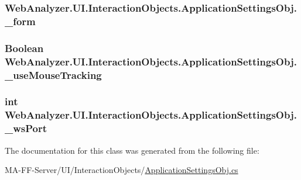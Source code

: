 \subsubsection[{\+\_\+form}]{ Web\+Analyzer.\+U\+I.\+Interaction\+Objects.\+Application\+Settings\+Obj.\+\_\+form\hspace{0.3cm}{\ttfamily [private]}}\label{class_web_analyzer_1_1_u_i_1_1_interaction_objects_1_1_application_settings_obj_a6b08a377c6dc1e9f0e32d0c786012756}
\hypertarget{class_web_analyzer_1_1_u_i_1_1_interaction_objects_1_1_application_settings_obj_a91a38f0e61ad09629d88131e49888523}{}
\subsubsection[{\+\_\+use\+Mouse\+Tracking}]{\setlength{\rightskip}{0pt plus 5cm}Boolean Web\+Analyzer.\+U\+I.\+Interaction\+Objects.\+Application\+Settings\+Obj.\+\_\+use\+Mouse\+Tracking\hspace{0.3cm}{\ttfamily [private]}}\label{class_web_analyzer_1_1_u_i_1_1_interaction_objects_1_1_application_settings_obj_a91a38f0e61ad09629d88131e49888523}
\hypertarget{class_web_analyzer_1_1_u_i_1_1_interaction_objects_1_1_application_settings_obj_aa8f8de8781d5d9fb22fa8b1d35ccf731}{}
\subsubsection[{\+\_\+ws\+Port}]{\setlength{\rightskip}{0pt plus 5cm}int Web\+Analyzer.\+U\+I.\+Interaction\+Objects.\+Application\+Settings\+Obj.\+\_\+ws\+Port\hspace{0.3cm}{\ttfamily [private]}}\label{class_web_analyzer_1_1_u_i_1_1_interaction_objects_1_1_application_settings_obj_aa8f8de8781d5d9fb22fa8b1d35ccf731}


The documentation for this class was generated from the following file\+:\begin{DoxyCompactItemize}
\item 
M\+A-\/\+F\+F-\/\+Server/\+U\+I/\+Interaction\+Objects/\hyperlink{_application_settings_obj_8cs}{Application\+Settings\+Obj.\+cs}\end{DoxyCompactItemize}
